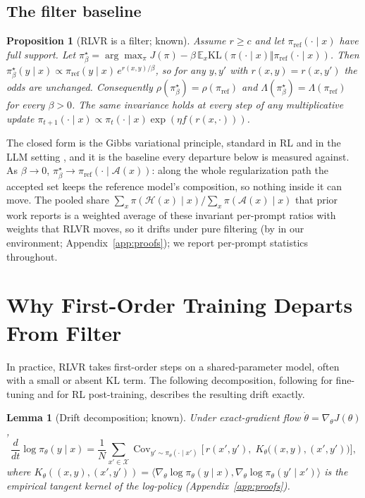 \documentclass{article}
\newtheorem{proposition}{Proposition}
\newtheorem{lemma}{Lemma}
\theoremstyle{definition}
\newcommand{\Xset}{\mathcal{X}}
\newcommand{\Acc}{\mathcal{A}}
\newcommand{\Hset}{\mathcal{H}}
\newcommand{\Kk}{K_\theta}
\newcommand{\pth}{\pi_\theta}
\DeclareMathOperator{\Cov}{Cov}
\begin{document}
\subsection{The filter baseline}

\begin{proposition}[RLVR is a filter; known]
\label{prop:filter}
Assume $r \geq c$ and let $\pi_{\mathrm{ref}}(\cdot\mid x)$ have full support. Let $\pi^\star_\beta = \arg\max_\pi J(\pi) - \beta\,\mathbb{E}_x \mathrm{KL}(\pi(\cdot\mid x)\Vert \pi_{\mathrm{ref}}(\cdot\mid x))$. Then $\pi^\star_\beta(y\mid x) \propto \pi_{\mathrm{ref}}(y\mid x)\, e^{r(x,y)/\beta}$, so for any $y,y'$ with $r(x,y)=r(x,y')$ the odds are unchanged. Consequently $\rho(\pi^\star_\beta) = \rho(\pi_{\mathrm{ref}})$ and $\Lambda(\pi^\star_\beta) = \Lambda(\pi_{\mathrm{ref}})$ for every $\beta>0$. The same invariance holds at every step of any multiplicative update $\pi_{t+1}(\cdot\mid x)\propto \pi_t(\cdot\mid x)\exp(\eta f(r(x,\cdot)))$.
\end{proposition}

The closed form is the Gibbs variational principle, standard in RL \citep{peters2010reps} and in the LLM setting \citep{korbak2022bayesian, kruszewski2026filtering, dymetman2026binary}, and it is the baseline every departure below is measured against. As $\beta\to0$, $\pi^\star_\beta \to \pi_{\mathrm{ref}}(\cdot\mid\Acc(x))$: along the whole regularization path the accepted set keeps the reference model's composition, so nothing inside it can move. The pooled share $\sum_x \pi(\Hset(x)\mid x)/\sum_x \pi(\Acc(x)\mid x)$ that prior work reports is a weighted average of these invariant per-prompt ratios with weights that RLVR moves, so it drifts under pure filtering (by \NullDriftMirrorPooled{} in our environment; Appendix~\ref{app:proofs}); we report per-prompt statistics throughout.

\section{Why First-Order Training Departs From Filter}
\label{sec:theory}

In practice, RLVR takes first-order steps on a shared-parameter model, often with a small or absent KL term. The following decomposition, following \citet{ren2025dynamics} for fine-tuning and \citet{tomihari2026rldynamics} for RL post-training, describes the resulting drift exactly.

\begin{lemma}[Drift decomposition; known]
\label{lem:drift}
Under exact-gradient flow $\dot\theta = \nabla_\theta J(\theta)$,
\begin{equation}
\frac{d}{dt}\log\pth(y\mid x)
= \frac{1}{N}\sum_{x' \in \Xset}
\Cov_{y'\sim\pth(\cdot\mid x')}\!\Big[\, r(x',y'),\; \Kk\big((x,y),(x',y')\big)\Big],
\label{eq:drift}
\end{equation}
where $\Kk((x,y),(x',y')) = \langle \nabla_\theta\log\pth(y\mid x), \nabla_\theta\log\pth(y'\mid x')\rangle$ is the empirical tangent kernel of the log-policy (Appendix~\ref{app:proofs}).
\end{lemma}
\end{document}
